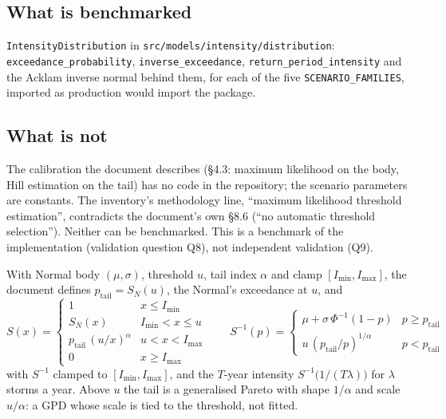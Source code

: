 \documentclass[11pt,a4paper]{article}
\begin{document}
\mkmpurpose

\subsection{What is benchmarked}
\texttt{IntensityDistribution} in \texttt{src/models/intensity/distribution}:
\texttt{exceedance\_probability}, \texttt{inverse\_exceedance},
\texttt{return\_period\_intensity} and the Acklam inverse normal behind them, for
each of the five \texttt{SCENARIO\_FAMILIES}, imported as production would import
the package.

\subsection{What is not}
The calibration the document describes (\S4.3: maximum likelihood on the body, Hill
estimation on the tail) has no code in the repository; the scenario parameters are
constants. The inventory's methodology line, ``maximum likelihood threshold
estimation'', contradicts the document's own \S8.6 (``no automatic threshold
selection''). Neither can be benchmarked. This is a benchmark of the implementation
(validation question Q8), not independent validation (Q9).

\mkmframework

With Normal body $(\mu,\sigma)$, threshold $u$, tail index $\alpha$ and clamp
$[I_{\min},I_{\max}]$, the document defines $p_{\text{tail}}=S_N(u)$, the Normal's
exceedance at $u$, and
\begin{equation}
S(x)=\begin{cases}
1 & x\le I_{\min}\\
S_N(x) & I_{\min}<x\le u\\
p_{\text{tail}}\,(u/x)^{\alpha} & u<x<I_{\max}\\
0 & x\ge I_{\max}
\end{cases}
\qquad
S^{-1}(p)=\begin{cases}
\mu+\sigma\,\Phi^{-1}(1-p) & p\ge p_{\text{tail}}\\
u\,(p_{\text{tail}}/p)^{1/\alpha} & p<p_{\text{tail}}
\end{cases}
\end{equation}
with $S^{-1}$ clamped to $[I_{\min},I_{\max}]$, and the $T$-year intensity
$S^{-1}\bigl(1/(T\lambda)\bigr)$ for $\lambda$ storms a year. Above $u$ the tail is
a generalised Pareto with shape $1/\alpha$ and scale $u/\alpha$: a GPD whose scale is
tied to the threshold, not fitted.
\end{document}
